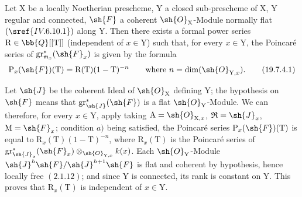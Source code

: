 \begin{corollary}[19.7.4]
\label{IV.19.7.4}
Let $\mathrm{X}$ be a locally Noetherian prescheme, $\mathrm{Y}$ a closed sub-prescheme of $\mathrm{X}$, $\mathrm{Y}$ regular and connected, $\sh{F}$ a coherent $\sh{O}_\mathrm{X}$-Module normally flat $(\sref{IV.6.10.1})$ along $\mathrm{Y}$. Then there exists a formal power series $\mathrm{R}\in\bb{Q}[[\mathrm{T}]]$ (independent of $x\in\mathrm{Y}$) such that, for every $x\in\mathrm{Y}$, the Poincar\'e series of $\operatorname{gr}_{\mathfrak{m}_x}^*(\sh{F}_x)$ is given by the formula
\begin{equation}
  \mathrm{P}_x(\sh{F})(\mathrm{T})=\mathrm{R}(\mathrm{T})(1-\mathrm{T})^{-n}\qquad\text{where }n=\dim(\sh{O}_{\mathrm{Y},x}).
  \tag{19.7.4.1}
\end{equation}

Let $\sh{J}$ be the coherent Ideal of $\sh{O}_\mathrm{X}$ defining $\mathrm{Y}$; the hypothesis on $\sh{F}$ means that $\operatorname{gr}_\sh{J}^*(\sh{F})$ is a flat $\sh{O}_\mathrm{Y}$-Module. We can therefore, for every $x\in\mathrm{Y}$, apply  taking $\mathrm{A}=\sh{O}_{\mathrm{X},x}$, $\mathfrak{R}=\sh{J}_x$, $\mathrm{M}=\sh{F}_x$; condition $a)$ being satisfied, the Poincar\'e series $\mathrm{P}_x(\sh{F})(\mathrm{T})$ is equal to $\mathrm{R}_x(\mathrm{T})(1-\mathrm{T})^{-n}$, where $\mathrm{R}_x(\mathrm{T})$ is the Poincar\'e series of $\operatorname{gr}_{\sh{J}_x}^*(\sh{F}_x)\otimes_{\sh{O}_{\mathrm{Y},x}}k(x)$. Each $\sh{O}_\mathrm{Y}$-Module $\sh{J}^h\sh{F}/\sh{J}^{h+1}\sh{F}$ is flat and coherent by hypothesis, hence locally free $(2.1.12)$; and since $\mathrm{Y}$ is connected, its rank is constant on $\mathrm{Y}$. This proves that $\mathrm{R}_x(\mathrm{T})$ is independent of $x\in\mathrm{Y}$.
\end{corollary}

